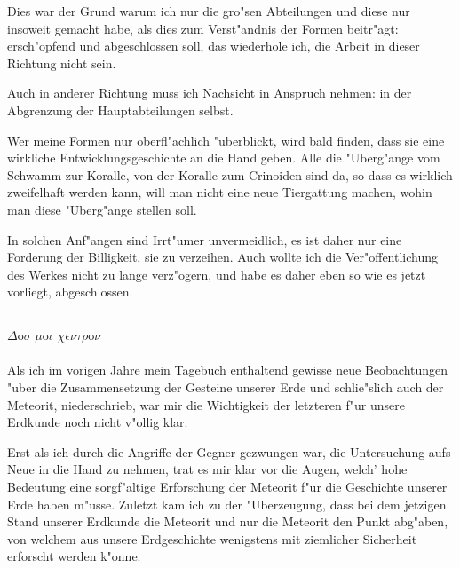 \documentclass[a4paper, 11pt, oneside]{article}
\begin{document}
Dies war der Grund warum ich nur die gro"sen Abteilungen und diese nur insoweit gemacht habe, als dies zum Verst"andnis der Formen beitr"agt: ersch"opfend und abgeschlossen soll, das wiederhole ich, die Arbeit in dieser Richtung nicht sein.

Auch in anderer Richtung muss ich Nachsicht in Anspruch nehmen: in der Abgrenzung der Hauptabteilungen selbst.

Wer meine Formen nur oberfl"achlich "uberblickt, wird bald finden, dass sie eine wirkliche Entwicklungsgeschichte an die Hand geben. Alle die "Uberg"ange vom Schwamm zur Koralle, von der Koralle zum Crinoiden sind da, so dass es wirklich zweifelhaft werden kann, will man nicht eine neue Tiergattung machen, wohin man diese "Uberg"ange stellen soll.

In solchen Anf"angen sind Irrt"umer unvermeidlich, es ist daher nur eine Forderung der Billigkeit, sie zu verzeihen. Auch wollte ich die Ver"offentlichung des Werkes nicht zu lange verz"ogern, und habe es daher eben so wie es jetzt vorliegt, abgeschlossen.
\clearpage
\subsection{}
$\Delta$o$\sigma$ $\mu$o$\iota$ $\chi\epsilon\nu\tau\rho$o$\nu$%
\paragraph{}
Als ich im vorigen Jahre mein Tagebuch enthaltend gewisse neue Beobachtungen "uber die Zusammensetzung der Gesteine unserer Erde und schlie"slich auch der Meteorit, niederschrieb, war mir die Wichtigkeit der letzteren f"ur unsere Erdkunde noch nicht v"ollig klar.

Erst als ich durch die Angriffe der Gegner gezwungen war, die Untersuchung aufs Neue in die Hand zu nehmen, trat es mir klar vor die Augen, welch' hohe Bedeutung eine sorgf"altige Erforschung der Meteorit f"ur die Geschichte unserer Erde haben m"usse. Zuletzt kam ich zu der "Uberzeugung, dass bei dem jetzigen Stand unserer Erdkunde die Meteorit und nur die Meteorit den Punkt abg"aben, von welchem aus unsere Erdgeschichte wenigstens mit ziemlicher Sicherheit erforscht werden k"onne.
\end{document}
